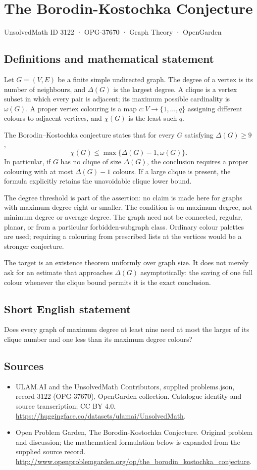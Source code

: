\documentclass[11pt,a4paper]{article}
\begin{document}
\section*{The Borodin-Kostochka Conjecture}\label{3122}
{\small UnsolvedMath ID 3122 · OPG-37670 · Graph Theory · OpenGarden}
\subsection{Definitions and mathematical statement}
Let $G=(V,E)$ be a finite simple undirected graph. The degree of a
vertex is its number of neighbours, and $\Delta(G)$ is the largest
degree. A clique is a vertex subset in which every pair is adjacent;
its maximum possible cardinality is $\omega(G)$.
A proper vertex colouring is a map $c:V\to\{1,\ldots,q\}$ assigning
different colours to adjacent vertices, and $\chi(G)$ is the least
such $q$.

The Borodin--Kostochka conjecture states that for every $G$ satisfying
$\Delta(G)\ge9$,
\[
 \chi(G)\le\max\{\Delta(G)-1,\omega(G)\}.
\]
In particular, if $G$ has no clique of size $\Delta(G)$, the conclusion
requires a proper colouring with at most $\Delta(G)-1$ colours. If a
large clique is present, the formula explicitly retains the unavoidable
clique lower bound.

The degree threshold is part of the assertion: no claim is made here
for graphs with maximum degree eight or smaller. The condition is on
maximum degree, not minimum degree or average degree. The graph need
not be connected, regular, planar, or from a particular forbidden-subgraph
class. Ordinary colour palettes are used; requiring a colouring from
prescribed lists at the vertices would be a stronger conjecture.

The target is an existence theorem uniformly over graph size. It does
not merely ask for an estimate that approaches $\Delta(G)$ asymptotically:
the saving of one full colour whenever the clique bound permits it is
the exact conclusion.
\subsection{Short English statement}
Does every graph of maximum degree at least nine need at most the larger of its clique number and one less than its maximum degree colours?
\subsection{Sources}
\begin{itemize}
\item[S1] ULAM.AI and the UnsolvedMath Contributors, supplied problems.json, record 3122 (OPG-37670), OpenGarden collection. Catalogue identity and source transcription; CC BY 4.0.
\url{https://huggingface.co/datasets/ulamai/UnsolvedMath}.
\item[S2] Open Problem Garden, The Borodin-Kostochka Conjecture. Original problem and discussion; the mathematical formulation below is expanded from the supplied source record.
\url{http://www.openproblemgarden.org/op/the_borodin_kostochka_conjecture}.
\end{itemize}
\end{document}
